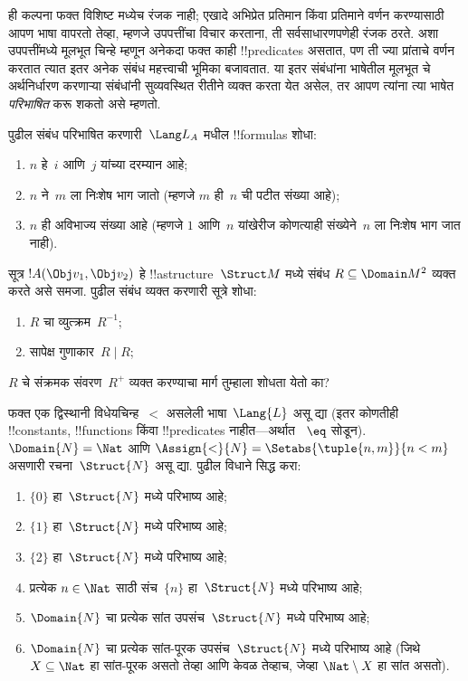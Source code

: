 \documentclass[../../../include/open-logic-section]{subfiles}
\begin{document}
\begin{explain}
ही कल्पना फक्त विशिष्ट मध्येच रंजक नाही; एखादे अभिप्रेत
प्रतिमान किंवा प्रतिमाने वर्णन करण्यासाठी आपण भाषा वापरतो तेव्हा, म्हणजे
उपपत्तींचा विचार करताना, ती सर्वसाधारणपणेही रंजक ठरते. अशा उपपत्तींमध्ये
मूलभूत चिन्हे म्हणून अनेकदा फक्त काही !!{predicate}s असतात, पण ती ज्या
प्रांताचे वर्णन करतात त्यात इतर अनेक संबंध महत्त्वाची भूमिका बजावतात. या
इतर संबंधांना भाषेतील मूलभूत चे अर्थनिर्धारण करणाऱ्या
संबंधांनी सुव्यवस्थित रीतीने व्यक्त करता येत असेल, तर आपण त्यांना त्या
भाषेत \emph{परिभाषित} करू शकतो असे म्हणतो.
\end{explain}

\begin{prob}
पुढील संबंध परिभाषित करणारी~$\Lang L_A$ मधील !!{formula}s शोधा:
\begin{enumerate}
\item $n$ हे~$i$ आणि~$j$ यांच्या दरम्यान आहे;
\item $n$ ने~$m$ ला निःशेष भाग जातो (म्हणजे $m$ ही~$n$ ची पटीत संख्या आहे);
\item $n$ ही अविभाज्य संख्या आहे (म्हणजे $1$ आणि~$n$ यांखेरीज कोणत्याही
  संख्येने~$n$ ला निःशेष भाग जात नाही).
\end{enumerate}
\end{prob}

\begin{prob}
सूत्र $!A(\Obj v_1, \Obj v_2)$ हे !!a{structure}~$\Struct M$ मध्ये संबंध
$R \subseteq \Domain M^2$ व्यक्त करते असे समजा. पुढील संबंध व्यक्त करणारी
सूत्रे शोधा:
\begin{enumerate}
\item $R$ चा व्युत्क्रम~$R^{-1}$;
\item सापेक्ष गुणाकार~$R \mid R$;
\end{enumerate}
$R$ चे संक्रमक संवरण~$R^+$ व्यक्त करण्याचा मार्ग तुम्हाला शोधता येतो का?
\end{prob}

\begin{prob}
फक्त एक द्विस्थानी विधेयचिन्ह~$<$ असलेली भाषा~$\Lang{L}$ असू द्या (इतर
कोणतीही !!{constant}s, !!{function}s किंवा !!{predicate}s नाहीत---अर्थात
~$\eq$ सोडून). $\Domain{N} = \Nat$ आणि
$\Assign{<}{N} = \Setabs{\tuple{n,m}}{n < m}$ असणारी रचना~$\Struct{N}$
असू द्या. पुढील विधाने सिद्ध करा:
\begin{enumerate}
\item $\{ 0 \}$ हा~$\Struct{N}$ मध्ये परिभाष्य आहे;
\item $\{ 1 \}$ हा~$\Struct{N}$ मध्ये परिभाष्य आहे;
\item $\{ 2 \}$ हा~$\Struct{N}$ मध्ये परिभाष्य आहे;
\item प्रत्येक $n \in \Nat$ साठी संच~$\{ n \}$ हा~$\Struct{N}$ मध्ये
  परिभाष्य आहे;
\item $\Domain{N}$ चा प्रत्येक सांत उपसंच~$\Struct{N}$ मध्ये परिभाष्य आहे;
\item $\Domain{N}$ चा प्रत्येक सांत-पूरक उपसंच~$\Struct{N}$ मध्ये परिभाष्य
  आहे (जिथे $X \subseteq \Nat$ हा सांत-पूरक असतो तेव्हा आणि केवळ तेव्हाच,
  जेव्हा $\Nat \setminus X$ हा सांत असतो).
\end{enumerate}
\end{prob}
\end{document}
